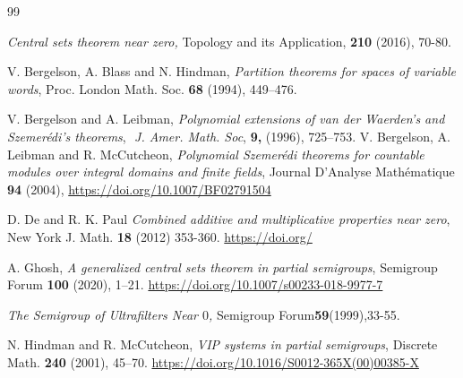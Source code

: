\documentclass[twoside,11pt]{article}
\begin{document}
\begin{thebibliography}{99}
	
	
	
	
	 \textit{ Central sets theorem near zero,
	}{Topology and its Application, }{\bf 210} {(2016)}, 70-80.
	
	
	V. Bergelson, A. Blass and N. Hindman,
	\textit{Partition theorems for spaces of variable words},
	Proc. London Math. Soc. \textbf{68} (1994), 449--476.
	
	
	 \newblock V‎. ‎Bergelson and A‎. ‎Leibman, \newblock \textit{Polynomial extensions of van der Waerden’s and Szemer{\'e}di’s theorems}‎,
	‎	\newblock \emph{J‎. ‎Amer‎. ‎Math‎. ‎Soc}‎, ‎\textbf{9,} (1996)‎, ‎725--753‎.
V. Bergelson, A. Leibman and R. McCutcheon, \textit{Polynomial Szemer\'{e}di theorems for countable modules over integral domains and finite fields}, Journal D'Analyse Math\'{e}matique \textbf{94} (2004), \url{https://doi.org/10.1007/BF02791504}
	
	D. De and R. K. Paul
	\textit{Combined additive and multiplicative properties near zero},
	New York J. Math. \textbf{18} (2012) 353-360.
	\url{https://doi.org/}
	
	
	A. Ghosh,
	\textit{A generalized central sets theorem in partial semigroups},
	Semigroup Forum \textbf{100} (2020), 1--21. 
	\url{https://doi.org/10.1007/s00233-018-9977-7}
	
	
	
	 {\it The Semigroup of Ultrafilters Near $0$,}{ Semigroup Forum}{\bf 59}{(1999)},33-55.
	
	
	N. Hindman and R. McCutcheon,
	\textit{VIP systems in partial semigroups},
	Discrete Math. \textbf{240} (2001), 45--70.
	\url{https://doi.org/10.1016/S0012-365X(00)00385-X}
	

\end{thebibliography}
\end{document}

